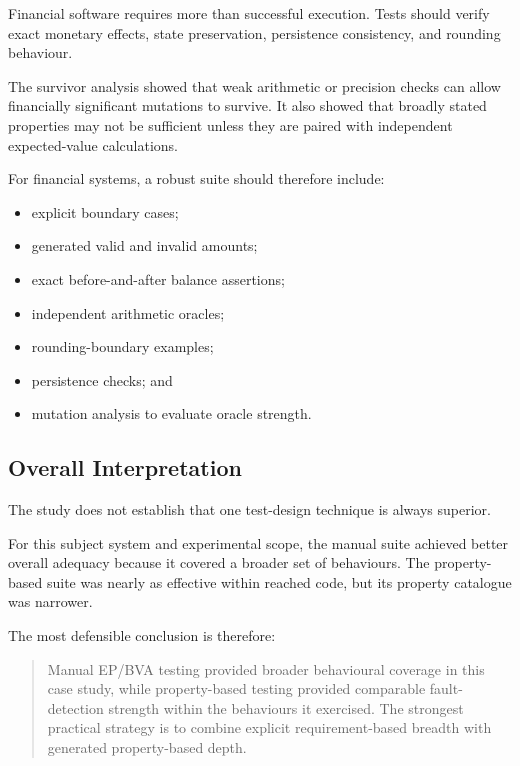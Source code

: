 \documentclass[12pt]{article}
\begin{document}
Financial software requires more than successful execution. Tests should verify
exact monetary effects, state preservation, persistence consistency, and
rounding behaviour.

The survivor analysis showed that weak arithmetic or precision checks can
allow financially significant mutations to survive. It also showed that
broadly stated properties may not be sufficient unless they are paired with
independent expected-value calculations.

For financial systems, a robust suite should therefore include:

\begin{itemize}
    \item explicit boundary cases;
    \item generated valid and invalid amounts;
    \item exact before-and-after balance assertions;
    \item independent arithmetic oracles;
    \item rounding-boundary examples;
    \item persistence checks; and
    \item mutation analysis to evaluate oracle strength.
\end{itemize}

\subsection{Overall Interpretation}

The study does not establish that one test-design technique is always superior.

For this subject system and experimental scope, the manual suite achieved
better overall adequacy because it covered a broader set of behaviours. The
property-based suite was nearly as effective within reached code, but its
property catalogue was narrower.

The most defensible conclusion is therefore:

\begin{quote}
Manual EP/BVA testing provided broader behavioural coverage in this case
study, while property-based testing provided comparable fault-detection
strength within the behaviours it exercised. The strongest practical strategy
is to combine explicit requirement-based breadth with generated
property-based depth.
\end{quote}

\end{document}
